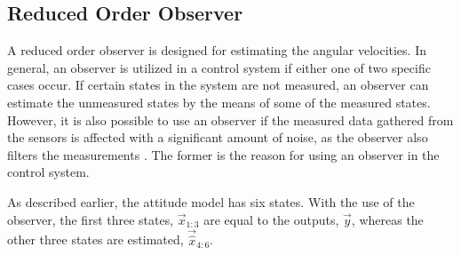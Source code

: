 \subsection{Reduced Order Observer}
A reduced order observer is designed for estimating the angular velocities. In general, an observer is utilized in a control system if either one of two specific cases occur. If certain states in the system are not measured, an observer can estimate the unmeasured states by the means of some of the measured states. However, it is also possible to use an observer if the measured data gathered from the sensors is affected with a significant amount of noise, as the observer also filters the measurements \cite{observerfilter}. The former is the reason for using an observer in the control system.

As described earlier, the attitude model has six states. With the use of the observer, the first three states, $\vec{x}_{1:3}$ are equal to the outputs, $\vec{y}$, whereas the other three states are estimated, $\vec{\hat{x}}_{4:6}$.

